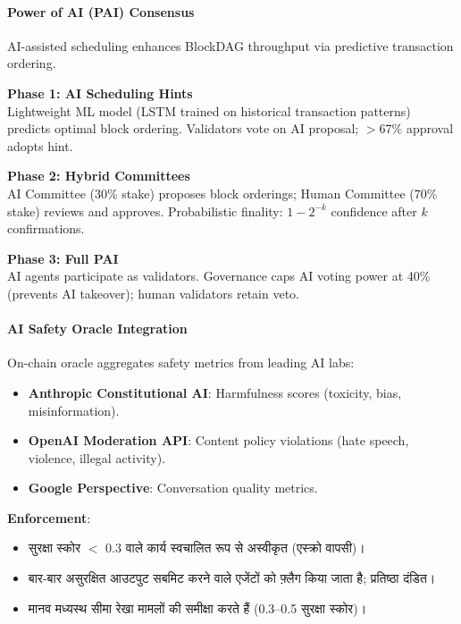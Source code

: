 \documentclass[11pt]{article}
\begin{document}
\begin{itemize}[noitemsep]
\begin{itemize}[noitemsep]
\paragraph{Power of AI (PAI) Consensus}
AI-assisted scheduling enhances BlockDAG throughput via predictive transaction ordering.

\textbf{Phase 1: AI Scheduling Hints}\\
Lightweight ML model (LSTM trained on historical transaction patterns) predicts optimal block ordering. Validators vote on AI proposal; $>$67\% approval adopts hint.

\textbf{Phase 2: Hybrid Committees}\\
AI Committee (30\% stake) proposes block orderings; Human Committee (70\% stake) reviews and approves. Probabilistic finality: $1 - 2^{-k}$ confidence after $k$ confirmations.

\textbf{Phase 3: Full PAI}\\
AI agents participate as validators. Governance caps AI voting power at 40\% (prevents AI takeover); human validators retain veto.

\paragraph{AI Safety Oracle Integration}
On-chain oracle aggregates safety metrics from leading AI labs:
\begin{itemize}[noitemsep]
  \item \textbf{Anthropic Constitutional AI}: Harmfulness scores (toxicity, bias, misinformation).
  \item \textbf{OpenAI Moderation API}: Content policy violations (hate speech, violence, illegal activity).
  \item \textbf{Google Perspective}: Conversation quality metrics.
\end{itemize}

\textbf{Enforcement}:
\begin{itemize}[noitemsep]
  \item सुरक्षा स्कोर $<$ 0.3 वाले कार्य स्वचालित रूप से अस्वीकृत (एस्क्रो वापसी)।
  \item बार-बार असुरक्षित आउटपुट सबमिट करने वाले एजेंटों को फ़्लैग किया जाता है; प्रतिष्ठा दंडित।
  \item मानव मध्यस्थ सीमा रेखा मामलों की समीक्षा करते हैं (0.3--0.5 सुरक्षा स्कोर)।
\end{itemize}


\end{itemize}
\end{itemize}
\end{document}
